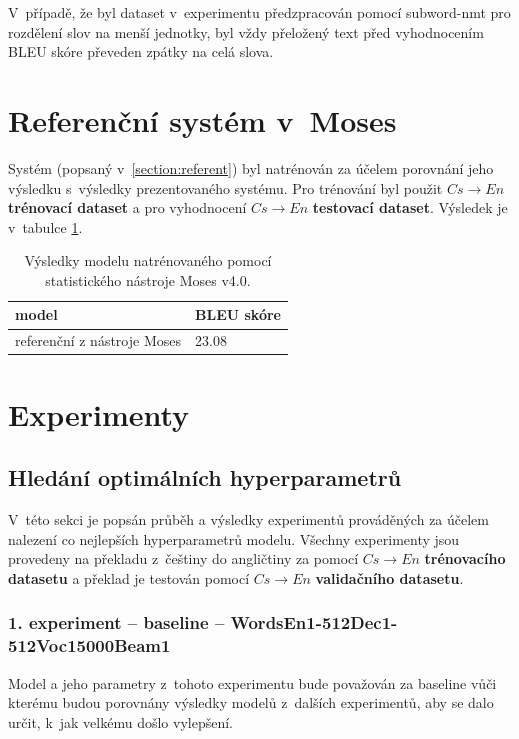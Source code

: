 V~případě, že byl dataset v~experimentu předzpracován pomocí subword-nmt pro rozdělení slov na menší jednotky, byl vždy přeložený text před vyhodnocením BLEU skóre převeden zpátky na celá slova.

\section{Referenční systém v~Moses}
Systém (popsaný v~\ref{section:referent}) byl natrénován za účelem porovnání jeho výsledku s~výsledky prezentovaného systému. Pro trénování byl použit $Cs\rightarrow En$ \textbf{trénovací dataset} a pro vyhodnocení $Cs\rightarrow En$ \textbf{testovací dataset}. Výsledek je v~tabulce \ref{table:referent}.

\begin{table}[H]
    \begin{center}
        \begin{tabular}{ll}
          \toprule
          model & BLEU skóre  \\
          \midrule
          referenční z nástroje Moses & 23.08\\
          \bottomrule
        \end{tabular}
    \end{center}
	\caption{Výsledky modelu natrénovaného pomocí statistického nástroje Moses v4.0.}
	\label{table:referent}
\end{table}

\section{Experimenty}

\subsection{Hledání optimálních hyperparametrů}\label{subsection:experimentsOptimal}
V~této sekci je popsán průběh a výsledky experimentů prováděných za účelem nalezení co nejlepších hyperparametrů modelu. Všechny experimenty jsou provedeny na překladu z~češtiny do angličtiny za pomocí $Cs\rightarrow En$ \textbf{trénovacího datasetu} a překlad je testován pomocí $Cs\rightarrow En$ \textbf{validačního datasetu}.

\subsubsection{1. experiment -- baseline -- WordsEn1-512Dec1-512Voc15000Beam1}\label{experiment1}
Model a jeho parametry z~tohoto experimentu bude považován za baseline vůči kterému budou porovnány výsledky modelů z~dalších experimentů, aby se dalo určit, k~jak velkému došlo vylepšení.

